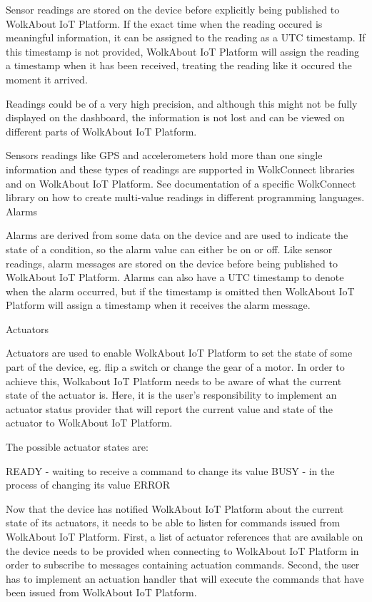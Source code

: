 Sensor readings are stored on the device before explicitly being published to Wolk\+About IoT Platform. If the exact time when the reading occured is meaningful information, it can be assigned to the reading as a U\+TC timestamp. If this timestamp is not provided, Wolk\+About IoT Platform will assign the reading a timestamp when it has been received, treating the reading like it occured the moment it arrived.

Readings could be of a very high precision, and although this might not be fully displayed on the dashboard, the information is not lost and can be viewed on different parts of Wolk\+About IoT Platform.

Sensors readings like G\+PS and accelerometers hold more than one single information and these types of readings are supported in Wolk\+Connect libraries and on Wolk\+About IoT Platform. See documentation of a specific Wolk\+Connect library on how to create multi-\/value readings in different programming languages. Alarms

Alarms are derived from some data on the device and are used to indicate the state of a condition, so the alarm value can either be on or off. Like sensor readings, alarm messages are stored on the device before being published to Wolk\+About IoT Platform. Alarms can also have a U\+TC timestamp to denote when the alarm occurred, but if the timestamp is omitted then Wolk\+About IoT Platform will assign a timestamp when it receives the alarm message.

Actuators

Actuators are used to enable Wolk\+About IoT Platform to set the state of some part of the device, eg. flip a switch or change the gear of a motor. In order to achieve this, Wolkabout IoT Platform needs to be aware of what the current state of the actuator is. Here, it is the user’s responsibility to implement an actuator status provider that will report the current value and state of the actuator to Wolk\+About IoT Platform.

The possible actuator states are\+:

R\+E\+A\+DY -\/ waiting to receive a command to change its value B\+U\+SY -\/ in the process of changing its value E\+R\+R\+OR

Now that the device has notified Wolk\+About IoT Platform about the current state of its actuators, it needs to be able to listen for commands issued from Wolk\+About IoT Platform. First, a list of actuator references that are available on the device needs to be provided when connecting to Wolk\+About IoT Platform in order to subscribe to messages containing actuation commands. Second, the user has to implement an actuation handler that will execute the commands that have been issued from Wolk\+About IoT Platform.

